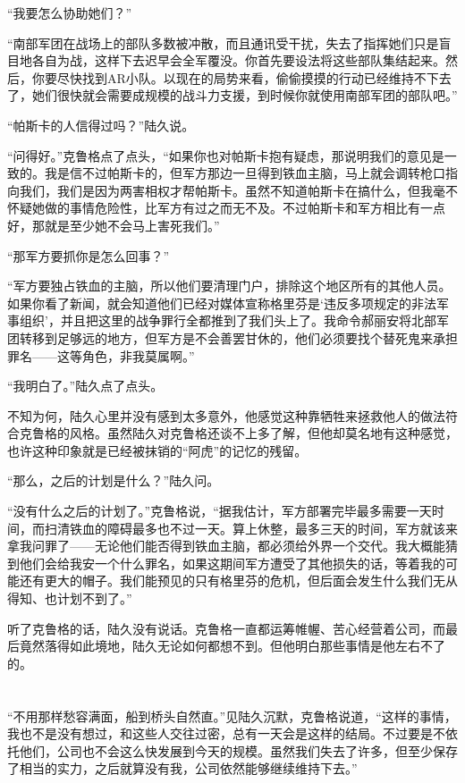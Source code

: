 “我要怎么协助她们？”

“南部军团在战场上的部队多数被冲散，而且通讯受干扰，失去了指挥她们只是盲目地各自为战，这样下去迟早会全军覆没。你首先要设法将这些部队集结起来。然后，你要尽快找到AR小队。以现在的局势来看，偷偷摸摸的行动已经维持不下去了，她们很快就会需要成规模的战斗力支援，到时候你就使用南部军团的部队吧。”

“帕斯卡的人信得过吗？”陆久说。

“问得好。”克鲁格点了点头，“如果你也对帕斯卡抱有疑虑，那说明我们的意见是一致的。我是信不过帕斯卡的，但军方那边一旦得到铁血主脑，马上就会调转枪口指向我们，我们是因为两害相权才帮帕斯卡。虽然不知道帕斯卡在搞什么，但我毫不怀疑她做的事情危险性，比军方有过之而无不及。不过帕斯卡和军方相比有一点好，那就是至少她不会马上害死我们。”

“那军方要抓你是怎么回事？”

“军方要独占铁血的主脑，所以他们要清理门户，排除这个地区所有的其他人员。如果你看了新闻，就会知道他们已经对媒体宣称格里芬是‘违反多项规定的非法军事组织’，并且把这里的战争罪行全都推到了我们头上了。我命令郝丽安将北部军团转移到足够远的地方，但军方是不会善罢甘休的，他们必须要找个替死鬼来承担罪名——这等角色，非我莫属啊。”

“我明白了。”陆久点了点头。

不知为何，陆久心里并没有感到太多意外，他感觉这种靠牺牲来拯救他人的做法符合克鲁格的风格。虽然陆久对克鲁格还谈不上多了解，但他却莫名地有这种感觉，也许这种印象就是已经被抹销的“阿虎”的记忆的残留。

“那么，之后的计划是什么？”陆久问。

“没有什么之后的计划了。”克鲁格说，“据我估计，军方部署完毕最多需要一天时间，而扫清铁血的障碍最多也不过一天。算上休整，最多三天的时间，军方就该来拿我问罪了——无论他们能否得到铁血主脑，都必须给外界一个交代。我大概能猜到他们会给我安一个什么罪名，如果这期间军方遭受了其他损失的话，等着我的可能还有更大的帽子。我们能预见的只有格里芬的危机，但后面会发生什么我们无从得知、也计划不到了。”

听了克鲁格的话，陆久没有说话。克鲁格一直都运筹帷幄、苦心经营着公司，而最后竟然落得如此境地，陆久无论如何都想不到。但他明白那些事情是他左右不了的。

\section*{}

“不用那样愁容满面，船到桥头自然直。”见陆久沉默，克鲁格说道，“这样的事情，我也不是没有想过，和这些人交往过密，总有一天会是这样的结局。不过要是不依托他们，公司也不会这么快发展到今天的规模。虽然我们失去了许多，但至少保存了相当的实力，之后就算没有我，公司依然能够继续维持下去。”

